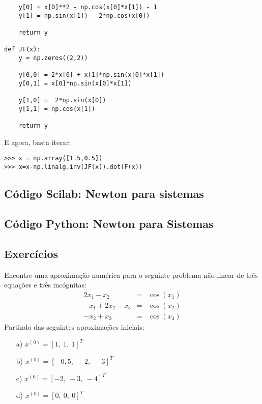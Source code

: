 \begin{sol}
\begin{verbatim}
    y[0] = x[0]**2 - np.cos(x[0]*x[1]) - 1
    y[1] = np.sin(x[1]) - 2*np.cos(x[0])
    
    return y

def JF(x):
    y = np.zeros((2,2))
    
    y[0,0] = 2*x[0] + x[1]*np.sin(x[0]*x[1])
    y[0,1] = x[0]*np.sin(x[0]*x[1])

    y[1,0] =  2*np.sin(x[0])
    y[1,1] = np.cos(x[1])

    return y
\end{verbatim}

E agora, basta iterar:
\begin{verbatim}
>>> x = np.array([1.5,0.5])
>>> x=x-np.linalg.inv(JF(x)).dot(F(x))
\end{verbatim}  
\fi
\end{sol}

\ifisscilab
\subsection{Código Scilab: Newton para sistemas}


\fi
\ifispython
\subsection{Código Python: Newton para Sistemas}


\fi

\subsection*{Exercícios}

\begin{exer} Encontre uma aproximação numérica para o seguinte problema não-linear de três equações e três incógnitas:
\begin{eqnarray*}
2x_1-x_2&=&\cos(x_1)\\
-x_1+2x_2-x_3&=&\cos(x_2)\\
-x_2+	x_3&=&\cos(x_3)
\end{eqnarray*}
Partindo das seguintes aproximações iniciais:
\begin{itemize}
\item[a)] $x^{(0)}=[1,~1,~1]^T$
\item[b)] $x^{(0)}=[-0,5,~-2,~-3]^T$
\item[c)] $x^{(0)}=[-2,~-3,~-4]^T$
\item[d)] $x^{(0)}=[0,~0,~0]^T$
\end{itemize}
\end{exer}


